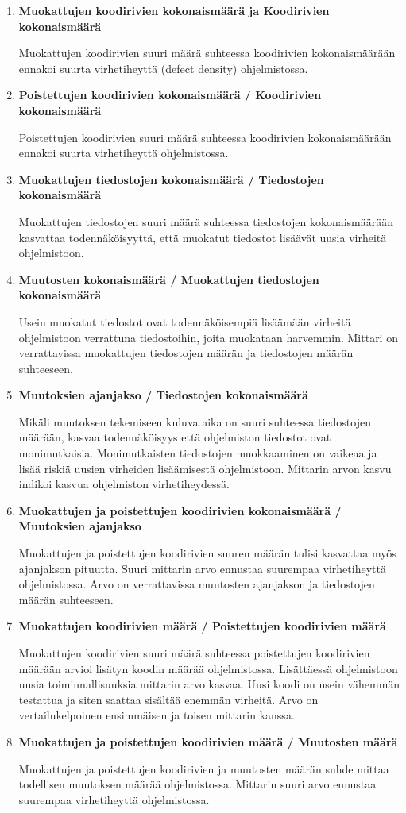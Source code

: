 \documentclass[finnish]{tktltiki2}
\theoremstyle{definition}
\theoremstyle{remark}
\begin{document}
\begin{enumerate}
    \item \textbf{Muokattujen koodirivien kokonaismäärä ja Koodirivien kokonaismäärä}

      Muokattujen koodirivien suuri määrä suhteessa koodirivien kokonaismäärään ennakoi suurta virhetiheyttä (defect density) ohjelmistossa.
    \item \textbf{Poistettujen koodirivien kokonaismäärä / Koodirivien kokonaismäärä}

      Poistettujen koodirivien suuri määrä suhteessa koodirivien kokonaismäärään ennakoi suurta virhetiheyttä ohjelmistossa.
    \item \textbf{Muokattujen tiedostojen kokonaismäärä / Tiedostojen kokonaismäärä}

      Muokattujen tiedostojen suuri määrä suhteessa tiedostojen kokonaismäärään kasvattaa todennäköisyyttä, että muokatut tiedostot lisäävät uusia virheitä ohjelmistoon.
    \item \textbf{Muutosten kokonaismäärä / Muokattujen tiedostojen kokonaismäärä}

      Usein muokatut tiedostot ovat todennäköisempiä lisäämään virheitä ohjelmistoon verrattuna tiedostoihin, joita muokataan harvemmin. Mittari on verrattavissa muokattujen tiedostojen määrän ja tiedostojen määrän suhteeseen.
    \item \textbf{Muutoksien ajanjakso / Tiedostojen kokonaismäärä}

      Mikäli muutoksen tekemiseen kuluva aika on suuri suhteessa tiedostojen määrään, kasvaa todennäköisyys että ohjelmiston tiedostot ovat monimutkaisia. Monimutkaisten tiedostojen muokkaaminen on vaikeaa ja lisää riskiä uusien virheiden lisäämisestä ohjelmistoon. Mittarin arvon kasvu indikoi kasvua ohjelmiston virhetiheydessä.
    \item \textbf{Muokattujen ja poistettujen koodirivien kokonaismäärä / Muutoksien ajanjakso}

      Muokattujen ja poistettujen koodirivien suuren määrän tulisi kasvattaa myös ajanjakson pituutta. Suuri mittarin arvo ennustaa suurempaa virhetiheyttä ohjelmistossa. Arvo on verrattavissa muutosten ajanjakson ja tiedostojen määrän suhteeseen.

    \item \textbf{Muokattujen koodirivien määrä / Poistettujen koodirivien määrä}

      Muokattujen koodirivien suuri määrä suhteessa poistettujen koodirivien määrään arvioi lisätyn koodin määrää ohjelmistossa. Lisättäessä ohjelmistoon uusia toiminnallisuuksia mittarin arvo kasvaa. Uusi koodi on usein vähemmän testattua ja siten saattaa sisältää enemmän virheitä. Arvo on vertailukelpoinen ensimmäisen ja toisen mittarin kanssa.
    \item \textbf{Muokattujen ja poistettujen koodirivien määrä / Muutosten määrä}

      Muokattujen ja poistettujen koodirivien ja muutosten määrän suhde mittaa todellisen muutoksen määrää ohjelmistossa. Mittarin suuri arvo ennustaa suurempaa virhetiheyttä ohjelmistossa.
\end{enumerate}
\end{document}
